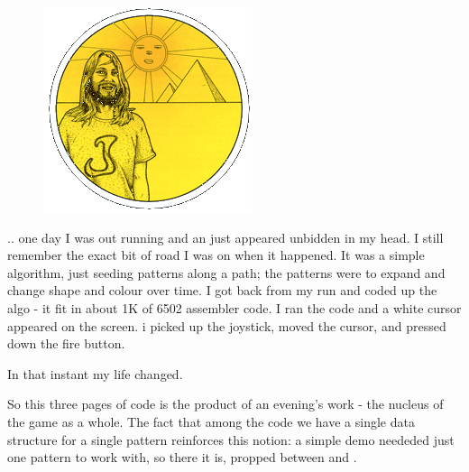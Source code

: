 \begin{definition}
\setlength{\intextsep}{0pt}%
\setlength{\columnsep}{3pt}%
\begin{figure}
\includegraphics[width=\linewidth]{src/callout/psych.png} 
\end{figure}
\small
.. one day I was out running and an just appeared unbidden in my head. I still
  remember the exact bit of road I was on when it happened. It was a
  simple algorithm, just seeding patterns along a path; the patterns were to
  expand and change shape and colour over time. I got back from my run and
  coded up the algo - it fit in about 1K of 6502 assembler code. I ran the code
  and a white cursor appeared on the screen. i picked up the joystick, moved
  the cursor, and pressed down the fire button.

In that instant my life changed.
\end{definition}

So this three pages of code is the product of an evening's work - the nucleus of the game as a whole. The fact that among
the code we have a single data structure for a single pattern reinforces this notion: a simple demo neededed just one
pattern to work with, so there it is, propped between  and .

